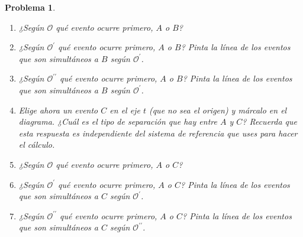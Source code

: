 \documentclass[12pt]{article}
\theoremstyle{break}
\newtheorem{exercise}{Problema}
\theoremstyle{nonumberbreak}
\newcommand*{\observer}{\mathcal{O}}
\newcommand*{\primeobserver}{\mathcal{O}^{\prime}}
\newcommand*{\biprimeobserver}{\mathcal{O}^{\prime\prime}}
\begin{document}
\begin{exercise}
\begin{enumerate}[label = \alph*)]
            \item ¿Según \(\observer\) qué evento ocurre primero, \(A\) o \(B\)?
            \item ¿Según \(\primeobserver\) qué evento ocurre primero, \(A\) o \(B\)? Pinta la línea de los eventos que son simultáneos a \(B\) según \(\primeobserver\).
            \item ¿Según \(\biprimeobserver\) qué evento ocurre primero, \(A\) o \(B\)? Pinta la línea de los eventos que son simultáneos a \(B\) según \(\primeobserver\).
            \item Elige ahora un evento \(C\) en el eje \(t\) (que no sea el origen) y márcalo en el diagrama. ¿Cuál es el tipo de separación que hay entre \(A\) y \(C\)? Recuerda que esta respuesta es independiente del sistema de referencia que uses para hacer el cálculo.
            \item ¿Según \(\observer\) qué evento ocurre primero, \(A\) o \(C\)?
            \item ¿Según \(\primeobserver\) qué evento ocurre primero, \(A\) o \(C\)? Pinta la línea de los eventos que son simultáneos a \(C\) según \(\primeobserver\).
            \item ¿Según \(\biprimeobserver\) qué evento ocurre primero, \(A\) o \(C\)? Pinta la línea de los eventos que son simultáneos a \(C\) según \(\biprimeobserver\).
        \end{enumerate}
    \end{exercise}
\end{document}
